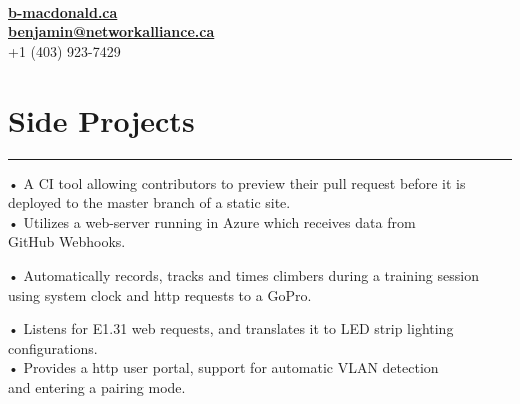\documentclass[]{resume}
\begin{document}
\begin{minipage}[t]{0.66\textwidth} 
\descript{}
\hspace*{0pt}\hfill    \\
\hspace*{0pt}\hfill    \\
\hspace*{0pt}\hfill    \\
\hspace*{0pt}\hfill \textbf{\href{https://b-macdonald.ca}{b-macdonald.ca}} \\
\hspace*{0pt}\hfill \textbf{\href{mailto:benjamin@networkalliance.ca}{benjamin@networkalliance.ca}} \\
\hspace*{0pt}\hfill +1 (403) 923-7429 \\

\section{Side Projects}
\noindent\rule{12.5cm}{0.4pt}
\noindent
\hspace{3em}%
\begin{minipage}{0.85\textwidth\vspace{5pt}}
• A CI tool allowing contributors to preview their pull request before it is deployed to the master branch of a static site.\\
• Utilizes a web-server running in Azure which receives data from\\GitHub Webhooks.
\end{minipage}
\noindent
\hspace{3em}%
\begin{minipage}{0.85\textwidth\vspace{5pt}}
• Automatically records, tracks and times climbers during a training session using system clock and http requests to a GoPro.
\end{minipage}
\noindent
\hspace{3em}%
\begin{minipage}{0.85\textwidth\vspace{5pt}}
• Listens for E1.31 web requests, and translates it to LED strip lighting configurations.\\
• Provides a http user portal, support for automatic VLAN detection\\and entering a pairing mode.
\end{minipage}

\end{minipage}
\end{document}
